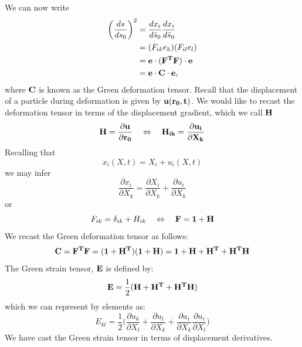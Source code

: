 We can now write
\begin{equation}
\label{eq:dsds02}
 \begin{split}
 \bigg(\frac{ds}{ds_0}\bigg)^2 &= \frac{dx_i}{d\bar{s}_0}\frac{dx_i}{d\bar{s}_0}  \\
 &= (F_{ik}e_k)(F_{il}e_l) \\
 &= {\bf{e\cdot (F^TF)\cdot e}} \\ 
 &= \bf{e\cdot C \cdot e},
 \end{split}
\end{equation}
where ${\bf{C}}$ is known as the Green deformation tensor. 
Recall
that the displacement of a particle during deformation is given by $\bf{u}(\bf{r}_0, t)$.
We would like to recast the deformation tensor in terms of the displacement gradient, which
we call $\bf{H}$
\begin{equation}
\label{eq:H}
 \bf{H} = \frac{\partial {\bf{u}}}{\partial {\bf{r}_0}} \quad \Leftrightarrow \quad H_{ik}=\frac{\partial u_i}{\partial X_k}
\end{equation}
Recalling that
\begin{equation}
 x_i(X,t) = X_i +u_i(X,t)
\end{equation}
we may infer
\begin{equation}
 \frac{\partial x_i}{\partial X_k} = \frac{\partial X_i}{\partial X_k}+ \frac{\partial u_i}{\partial X_k}
\end{equation}
or
\begin{equation}
 F_{ik} = \delta_{ik}+ H_{ik} \quad \Leftrightarrow \quad \bf{F} = \bf{1} + \bf{H}
\end{equation}
We recast the Green deformation tensor as follows:
\begin{equation}
 {\bf{C}}= {\bf{F^TF}} = ({\bf{1}} + {\bf{H^T}})({\bf{1}}+ {\bf{H}})= {\bf{1}}+ {\bf{H}} + {\bf{H^T}} +{\bf{H^TH}}
\end{equation}
The Green strain tensor, ${\bf{E}}$ is defined by:
\begin{equation}
\label{eq:H2E}
 {\bf{E}}= \frac{1}{2}({\bf{H}} + {\bf{H^T}} + {\bf{H^TH}})
\end{equation}
which we can represent by elements as:
\begin{equation}
 E_{kl}=\frac{1}{2}\bigg(\frac{\partial u_k}{\partial X_l}  + \frac{\partial u_l}{\partial X_k} +
 \frac{\partial u_i}{\partial X_k}\frac{\partial u_i}{\partial X_l}\bigg)
\end{equation}
We have cast the Green strain tensor in terms of displacement derivatives.  


